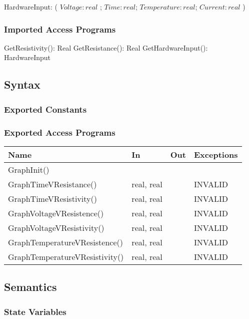 \documentclass[12pt, titlepage]{article}
\begin{document}
HardwareInput: ( $Voltage: real $ ; $Time: real$; $Temperature: real$; $Current: real$ )\\

\subsubsection{Imported Access Programs}

  GetResistivity(): Real
  GetResistance(): Real
  GetHardwareInput(): HardwareInput

\subsection{Syntax}

\subsubsection{Exported Constants}

\subsubsection{Exported Access Programs}

\begin{center}
\begin{tabular}{p{6cm} p{2cm} p{2cm} p{3cm}}
\hline
\textbf{Name} & \textbf{In} & \textbf{Out} & \textbf{Exceptions} \\
\hline
GraphInit() & &  &  \\
GraphTimeVResistance() & real, real &  & INVALID \\
GraphTimeVResistivity() & real, real &  & INVALID \\
GraphVoltageVResistence() & real, real &  & INVALID \\
GraphVoltageVResistivity() & real, real &  & INVALID \\
GraphTemperatureVResistence() & real, real &  & INVALID \\
GraphTemperatureVResistivity() & real, real &  & INVALID \\
\hline
\end{tabular}
\end{center}

\subsection{Semantics}

\subsubsection{State Variables}
\end{document}
